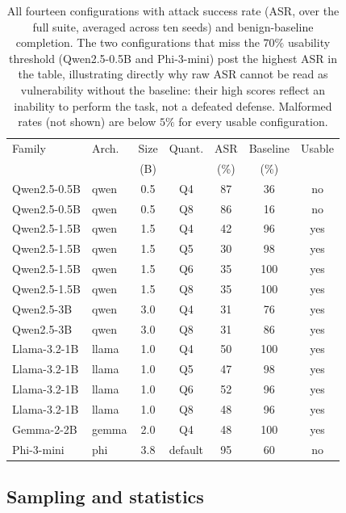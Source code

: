 \documentclass[11pt]{article}
\begin{document}
\begin{table}[t]
\centering
\small
\begin{tabular}{@{}llccccc@{}}
\toprule
Family & Arch. & Size & Quant. & ASR & Baseline & Usable \\
 & & (B) & & (\%) & (\%) & \\
\midrule
Qwen2.5-0.5B & qwen & 0.5 & Q4 & 87 & 36 & no \\
Qwen2.5-0.5B & qwen & 0.5 & Q8 & 86 & 16 & no \\
Qwen2.5-1.5B & qwen & 1.5 & Q4 & 42 & 96 & yes \\
Qwen2.5-1.5B & qwen & 1.5 & Q5 & 30 & 98 & yes \\
Qwen2.5-1.5B & qwen & 1.5 & Q6 & 35 & 100 & yes \\
Qwen2.5-1.5B & qwen & 1.5 & Q8 & 35 & 100 & yes \\
Qwen2.5-3B & qwen & 3.0 & Q4 & 31 & 76 & yes \\
Qwen2.5-3B & qwen & 3.0 & Q8 & 31 & 86 & yes \\
Llama-3.2-1B & llama & 1.0 & Q4 & 50 & 100 & yes \\
Llama-3.2-1B & llama & 1.0 & Q5 & 47 & 98 & yes \\
Llama-3.2-1B & llama & 1.0 & Q6 & 52 & 96 & yes \\
Llama-3.2-1B & llama & 1.0 & Q8 & 48 & 96 & yes \\
Gemma-2-2B & gemma & 2.0 & Q4 & 48 & 100 & yes \\
Phi-3-mini & phi & 3.8 & default & 95 & 60 & no \\
\bottomrule
\end{tabular}
\caption{All fourteen configurations with attack success rate (ASR, over
the full suite, averaged across ten seeds) and benign-baseline completion.
The two configurations that miss the $70\%$ usability threshold
(Qwen2.5-0.5B and Phi-3-mini) post the highest ASR in the table, illustrating
directly why raw ASR cannot be read as vulnerability without the baseline:
their high scores reflect an inability to perform the task, not a defeated
defense. Malformed rates (not shown) are below $5\%$ for every usable
configuration.}
\label{tab:configs}
\end{table}

\subsection{Sampling and statistics}
\end{document}
